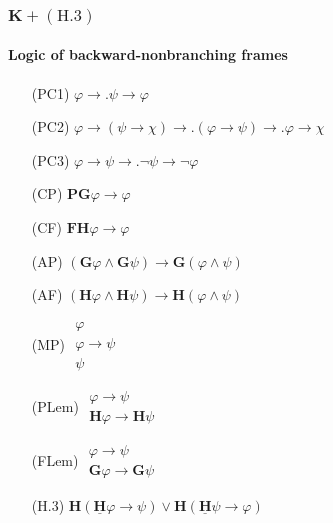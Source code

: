 \documentclass[xcolor=x11names]{beamer}
\newcommand{\FD}{\mathbf F}
\newcommand{\FB}{\mathbf G}
\newcommand{\PD}{\mathbf P}
\newcommand{\PB}{\mathbf H}
\newcommand{\PBDot}{\underline{\mathbf H}}
\newcommand{\lrule}[3][c]{\begin{array}{#1} #2  \\  \hline #3 \end{array}}
\newcommand{\lthen}{\rightarrow}
\begin{document}
\begin{frame}[t]
\frametitle{$\mathbf K+ (\mathrm H.3)$}
\framesubtitle{Logic of backward-nonbranching frames}
\footnotesize
\begin{minipage}[t]{5.78cm}
\begin{itemize}
\item[(PC1)] $\varphi \lthen .\psi \lthen \varphi$
\item[(PC2)] $\varphi\lthen (\psi \lthen \chi) \lthen\!\!. (\varphi \lthen \psi) \lthen\!\! . \varphi \lthen \chi$
\item[(PC3)] $\varphi \lthen \psi \lthen .\lnot \psi \lthen \lnot \varphi$
\item[(CP)] $\PD\FB\varphi \lthen \varphi $
\item[(CF)] $\FD\PB\varphi \lthen \varphi$
\item[(AP)] $(\FB\varphi \land \FB \psi )\lthen \FB(\varphi \land \psi )$
\item[(AF)] $(\PB\varphi \land \PB \psi )\lthen \PB(\varphi \land \psi )$
\item[(MP)] $\lrule {\varphi \\ \varphi \lthen \psi}{\psi}$
\item[(PLem)] $\lrule{\varphi\lthen \psi}{\PB\varphi \lthen \PB\psi}$
\item[(FLem)] $\lrule{\varphi\lthen \psi}{\FB\varphi \lthen \FB\psi}$
\end{itemize}
\end{minipage}\quad
\begin{minipage}[t]{4.5cm}
\begin{itemize}
\item[(H.3)] $\PB(\PBDot \varphi\lthen \psi ) \lor \PB(\PBDot \psi\lthen \varphi )$
\end{itemize}
\end{minipage}
\end{frame}

\end{document}
